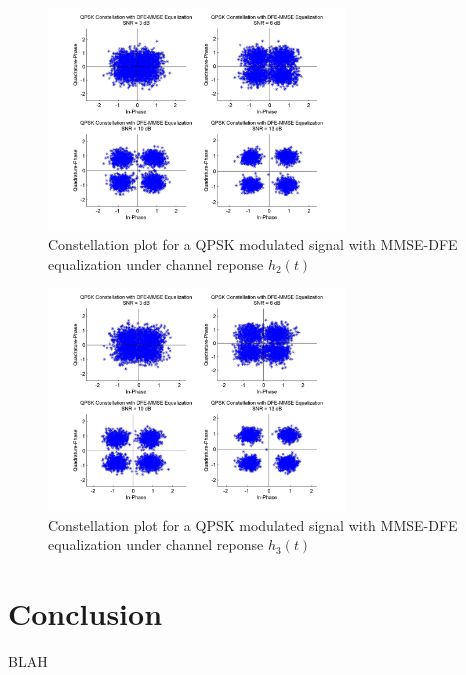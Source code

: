 \documentclass[]{article}
\begin{document}
\begin{figure}[H]
\centering
\includegraphics[width=0.7\textwidth]{qpConstDFEMMSE2.jpg}
\caption{Constellation plot for a QPSK modulated signal with MMSE-DFE equalization under channel reponse $h_2(t)$}
\end{figure}

\begin{figure}[H]
\centering
\includegraphics[width=0.7\textwidth]{qpConstDFEMMSE3.jpg}
\caption{Constellation plot for a QPSK modulated signal with MMSE-DFE equalization under channel reponse $h_3(t)$}
\end{figure}


\newpage
\section{Conclusion}
\label{sec:conc}

BLAH

\appendix
\newpage


\newpage
%
\end{document}
